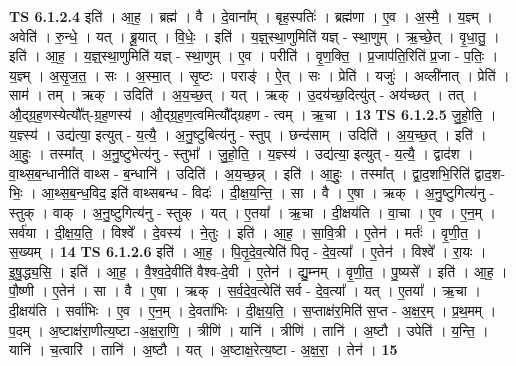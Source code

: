 \documentclass[17pt]{extarticle}
\begin{document}
                  \newline
                                \textbf{ TS 6.1.2.4} \newline
                  इति॑ । आ॒ह॒ । ब्रह्म॑ । वै । दे॒वाना᳚म् । बृह॒स्पतिः॑ । ब्रह्म॑णा । ए॒व । अ॒स्मै॒ । य॒ज्ञ्म् । अवेति॑ । रु॒न्धे॒ । यत् । ब्रू॒यात् । वि॒धेः॒ । इति॑ । य॒ज्ञ्॒स्था॒णुमिति॑ यज्ञ् - स्था॒णुम् । ऋ॒च्छे॒त् । वृ॒धा॒तु॒ । इति॑ । आ॒ह॒ । य॒ज्ञ्॒स्था॒णुमिति॑ यज्ञ् - स्था॒णुम् । ए॒व । परीति॑ । वृ॒ण॒क्ति॒ । प्र॒जाप॑ति॒रिति॑ प्र॒जा - प॒तिः॒ । य॒ज्ञ्म् । अ॒सृ॒ज॒त॒ । सः । अ॒स्मा॒त् । सृ॒ष्टः । पराङ्॑ । ऐ॒त् । सः । प्रेति॑ । यजुः॑ । अव्ली॑नात् । प्रेति॑ । साम॑ । तम् । ऋक् । उदिति॑ । अ॒य॒च्छ॒त् । यत् । ऋक् । उ॒दय॑च्छ॒दित्यु॑त् - अय॑च्छत् । तत् । औ॒द्ग्र॒ह॒णस्येत्यौ᳚त्-ग्र॒ह॒णस्य॑ । औ॒द्ग्र॒ह॒ण॒त्वमित्यौ᳚द्ग्रहण - त्वम् । ऋ॒चा । \textbf{  13} \newline
                  \newline
                                \textbf{ TS 6.1.2.5} \newline
                  जु॒हो॒ति॒ । य॒ज्ञ्स्य॑ । उद्य॑त्या॒ इत्युत् - य॒त्यै॒ । अ॒नु॒ष्टुबित्य॑नु - स्तुप् । छन्द॑साम् । उदिति॑ । अ॒य॒च्छ॒त् । इति॑ । आ॒हुः॒ । तस्मा᳚त् । अ॒नु॒ष्टुभेत्य॑नु - स्तुभा᳚ । जु॒हो॒ति॒ । य॒ज्ञ्स्य॑ । उद्य॑त्या॒ इत्युत् - य॒त्यै॒ । द्वाद॑श । वा॒थ्स॒ब॒न्धानीति॑ वाथ्स - ब॒न्धानि॑ । उदिति॑ । अ॒य॒च्छ॒न्न् । इति॑ । आ॒हुः॒ । तस्मा᳚त् । द्वा॒द॒शभि॒रिति॑ द्वाद॒श-भिः॒ । आ॒थ्स॒ब॒न्ध॒विद॒ इति॑ वाथ्सबन्ध - विदः॑ । दी॒क्ष॒य॒न्ति॒ । सा । वै । ए॒षा । ऋक् । अ॒नु॒ष्टुगित्य॑नु - स्तुक् । वाक् । अ॒नु॒ष्टुगित्य॑नु - स्तुक् । यत् । ए॒तया᳚ । ऋ॒चा । दी॒क्षय॑ति । वा॒चा । ए॒व । ए॒न॒म् । सर्व॑या । दी॒क्ष॒य॒ति॒ । विश्वे᳚ । दे॒वस्य॑ । ने॒तुः । इति॑ । आ॒ह॒ । सा॒वि॒त्री । ए॒तेन॑ । मर्तः॑ । वृ॒णी॒त॒ । स॒ख्यम् । \textbf{  14} \newline
                  \newline
                                \textbf{ TS 6.1.2.6} \newline
                  इति॑ । आ॒ह॒ । पि॒तृ॒दे॒व॒त्येति॑ पितृ - दे॒व॒त्या᳚ । ए॒तेन॑ । विश्वे᳚ । रा॒यः । इ॒षु॒द्ध्य॒सि॒ । इति॑ । आ॒ह॒ । वै॒श्व॒दे॒वीति॑ वैश्व-दे॒वी । ए॒तेन॑ । द्यु॒म्नम् । वृ॒णी॒त॒ । पु॒ष्यसे᳚ । इति॑ । आ॒ह॒ । पौ॒ष्णी । ए॒तेन॑ । सा । वै । ए॒षा । ऋक् । स॒र्व॒दे॒व॒त्येति॑ सर्व - दे॒व॒त्या᳚ । यत् । ए॒तया᳚ । ऋ॒चा । दी॒क्षय॑ति । सर्वा॑भिः । ए॒व । ए॒न॒म् । दे॒वता॑भिः । दी॒क्ष॒य॒ति॒ । स॒प्ताक्ष॑र॒मिति॑ स॒प्त - अ॒क्ष॒र॒म् । प्र॒थ॒मम् । प॒दम् । अ॒ष्टाक्ष॑रा॒णीत्य॒ष्टा -अ॒क्ष॒रा॒णि॒ । त्रीणि॑ । यानि॑ । त्रीणि॑ । तानि॑ । अ॒ष्टौ । उपेति॑ । य॒न्ति॒ । यानि॑ । च॒त्वारि॑ । तानि॑ । अ॒ष्टौ । यत् । अ॒ष्टाक्ष॒रेत्य॒ष्टा - अ॒क्ष॒रा॒ । तेन॑ । \textbf{  15} \newline
\end{document}
